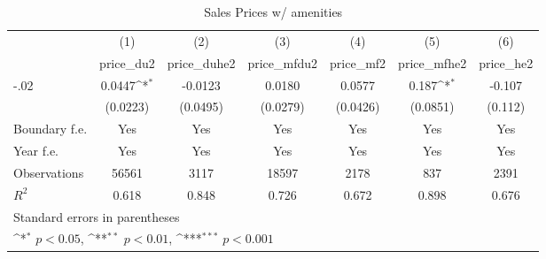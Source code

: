 \begin{table}[htbp]\centering
\def\sym#1{\ifmmode^{#1}\else\(^{#1}\)\fi}
\caption{Sales Prices w/ amenities}
\begin{tabular}{l*{6}{c}}
\hline\hline
                    &\multicolumn{1}{c}{(1)}&\multicolumn{1}{c}{(2)}&\multicolumn{1}{c}{(3)}&\multicolumn{1}{c}{(4)}&\multicolumn{1}{c}{(5)}&\multicolumn{1}{c}{(6)}\\
                    &\multicolumn{1}{c}{price\_du2}&\multicolumn{1}{c}{price\_duhe2}&\multicolumn{1}{c}{price\_mfdu2}&\multicolumn{1}{c}{price\_mf2}&\multicolumn{1}{c}{price\_mfhe2}&\multicolumn{1}{c}{price\_he2}\\
\hline
-.02                &      0.0447\sym{*}  &     -0.0123         &      0.0180         &      0.0577         &       0.187\sym{*}  &      -0.107         \\
                    &    (0.0223)         &    (0.0495)         &    (0.0279)         &    (0.0426)         &    (0.0851)         &     (0.112)         \\
[1em]
Boundary f.e.       &         Yes         &         Yes         &         Yes         &         Yes         &         Yes         &         Yes         \\
[1em]
Year f.e.           &         Yes         &         Yes         &         Yes         &         Yes         &         Yes         &         Yes         \\
\hline
Observations        &       56561         &        3117         &       18597         &        2178         &         837         &        2391         \\
\(R^{2}\)           &       0.618         &       0.848         &       0.726         &       0.672         &       0.898         &       0.676         \\
\hline\hline
\multicolumn{7}{l}{\footnotesize Standard errors in parentheses}\\
\multicolumn{7}{l}{\footnotesize \sym{*} \(p<0.05\), \sym{**} \(p<0.01\), \sym{***} \(p<0.001\)}\\
\end{tabular}
\end{table}
